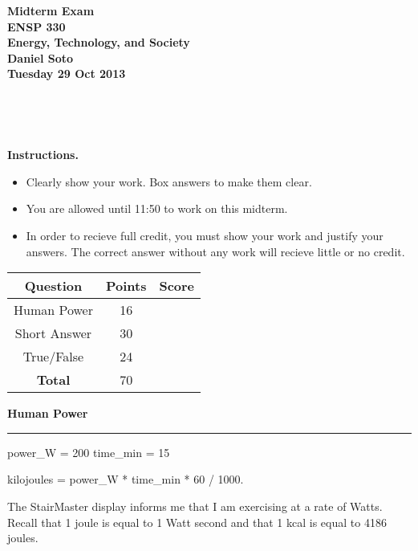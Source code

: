 \documentclass[12pt, oneside]{article}
\newcommand{\tablerow}[2]
{\rule[-0.3cm]{0cm}{1cm}#1 & #2 & \\ \hline}
\newcommand{\chead}[1]
{\begin{center}\large\textbf{#1}\end{center}
\hrule
\vspace{10pt}}
\begin{document}
\begin{center}
{\bf Midterm Exam}\\
{\bf ENSP 330}\\
{\bf Energy, Technology, and Society}\\
{\bf Daniel Soto}\\
{\bf Tuesday 29 Oct 2013}\\
\end{center}


\framebox[4.5in]{\rule{0cm}{1.5cm}}\\
\vspace{0.2cm}

\framebox[4.5in]{\rule{0cm}{1.5cm}}\\
\vspace{0.8cm}


\noindent
{\bf Instructions.}
\begin{itemize}
\item Clearly show your work.  Box answers to make them clear.
\item You are allowed until 11:50 to work on this midterm.
\item In order to recieve full credit, you must show your work and
justify your answers.  The correct answer without any work will recieve
little or no credit.
\end{itemize}

\vfill

\begin{center}
\begin{tabular}{|c|c|c|}
\hline
\rule[-0.3cm]{0cm}{1cm}
Question & Points & Score \\
\hline
\tablerow{Human Power}{16}
\tablerow{Short Answer}{30}
\tablerow{True/False}{24}
\tablerow{\bf{Total}}{70}
\end{tabular}
\end{center}

\vfill


%
%

\newpage
\chead{Human Power}

\begin{pycode}
power_W = 200
time_min = 15

kilojoules = power_W * time_min * 60 / 1000.
\end{pycode}

The StairMaster display informs me that I am exercising at a rate of
 Watts.  Recall that 1 joule is equal to 1 Watt second and that 1 kcal
is equal to 4186 joules.
\end{document}
